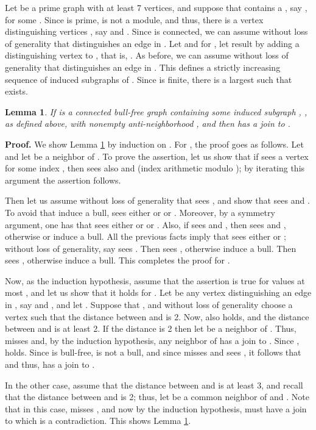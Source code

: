 \documentclass[11pt]{article}
\newcommand{\qed}{\hfill }
\newcommand{\0}{\text{ has a co-join to }}
\newcommand{\1}{\text{ has a join to }}
\newtheorem{lemm}{Lemma}
\begin{document}
Let  be a prime graph with at least 7 vertices, and suppose that  contains a , say , for some . Since  is prime,  is not a module, and thus, there is a vertex  distinguishing vertices , say  and . Since  is connected, we can assume without loss of generality that  distinguishes an edge  in . Let  and for , let  result by adding a distinguishing vertex  to , that is, . As before, we can assume without loss of generality that  distinguishes an edge in . This defines a strictly increasing sequence of induced subgraphs of . Since  is finite, there is a largest  such that  exists.    

\begin{lemm}\label{lemm:bull}
If  is a connected bull-free graph containing some induced subgraph , , as defined above, with nonempty anti-neighborhood , and  then  has a join to . 
\end{lemm}

\noindent 
{\bf Proof.}
We show Lemma \ref{lemm:bull} by induction on . For , the proof goes as follows. Let  and let  be a neighbor of . To prove the assertion, let us show that if  sees a vertex  for some index , then  sees also  and  (index arithmetic modulo ); by iterating this argument the assertion follows.

Then let us assume without loss of generality that  sees , and show that  sees  and . To avoid that  induce a bull,  sees either  or  or . Moreover, by a symmetry argument, one has that  sees either  or  or . Also, if  sees  and , then  sees  and , otherwise  or  induce a bull. All the previous facts imply that  sees either  or ; without loss of generality, say  sees . Then  sees , otherwise  induce a bull. Then  sees , otherwise  induce a bull. This completes the proof for . 

\medskip

Now, as the induction hypothesis, assume that the assertion is true for values at most , and let us show that it holds for . Let  be any vertex distinguishing an edge  in , say  and , and let . 
Suppose that , and without loss of generality choose a vertex  such that the distance between  and  is 2. Now, also  holds, and the distance between  and  is at least 2. If the distance is 2 then let  be a neighbor of . Thus,  misses  and, by the induction hypothesis, any neighbor  of  has a join to . Since ,  holds. Since  is bull-free,  is not a bull, and since  misses  and  sees , it follows that  and thus,  has a join to . 

In the other case, assume that the distance between  and  is at least 3, and recall that the distance between  and  is 2; thus, let  be a common neighbor of  and . Note that in this case,  misses , and now by the induction hypothesis,  must have a join to  which is a contradiction.  
This shows Lemma \ref{lemm:bull}. 
\qed
\end{document}
